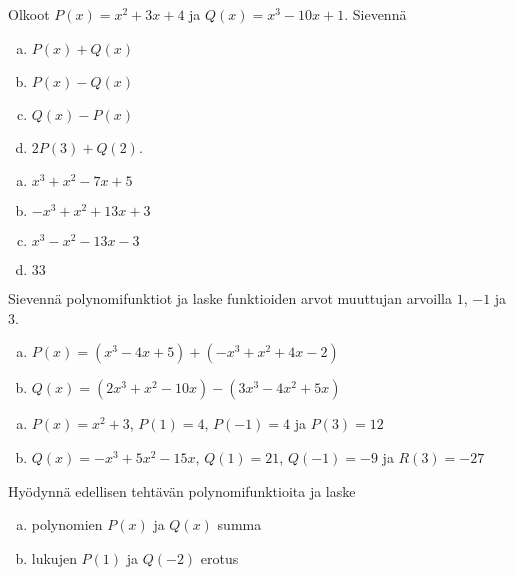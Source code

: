 \begin{tehtavasivu}
\begin{tehtava}
    Olkoot $P(x)=x^2+3x+4$ ja $Q(x)=x^3-10x+1$. Sievennä
    \begin{enumerate}[a)]
        \item $P(x)+Q(x)$
        \item $P(x)-Q(x)$
        \item $Q(x)-P(x)$
        \item $2P(3)+Q(2)$.
    \end{enumerate}
    \begin{vastaus}
        \begin{enumerate}[a)]
            \item $x^3+x^2-7x+5$ %
            \item $-x^3+x^2+13x+3$ %
            \item $x^3-x^2-13x-3$ %
            \item $33$ %
        \end{enumerate}
    \end{vastaus}
\end{tehtava}

\begin{tehtava}
	Sievennä polynomifunktiot ja laske funktioiden arvot muuttujan arvoilla $1$, $-1$ ja $3$.
	\begin{enumerate}[a)]
		\item $P(x)=(x^3-4x+5)+(-x^3+x^2+4x-2)$
		\item $Q(x)=(2x^3+x^2-10x)-(3x^3-4x^2+5x)$
	\end{enumerate}
	
	\begin{vastaus}
		\begin{enumerate}[a)]
			\item $P(x)=x^2+3$, $P(1)=4$, $P(-1)=4$ ja $P(3)=12$
			\item $Q(x)=-x^3+5x^2-15x$, $Q(1)=21$, $Q(-1)=-9$ ja $R(3)=-27$
		\end{enumerate}
	\end{vastaus}
\end{tehtava}

\begin{tehtava}
	Hyödynnä edellisen tehtävän polynomifunktioita ja laske
	\begin{enumerate}[a)]
		 \item polynomien $P(x)$ ja $Q(x)$ summa
		 \item lukujen $P(1)$ ja $Q(-2)$ erotus
	\end{enumerate}
	

\end{tehtava}
\end{tehtavasivu}
